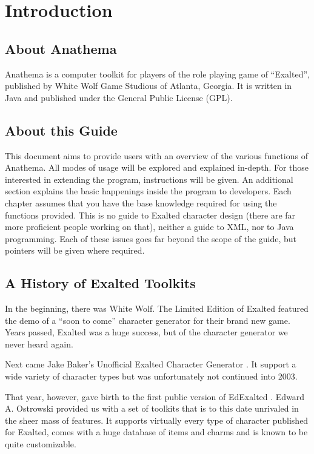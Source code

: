 \chapter{Introduction}
\section{About Anathema}
Anathema is a computer toolkit for players of the role playing game of ``Exalted'', published by White Wolf Game Studious of Atlanta, Georgia. It is written in Java and published under the General Public License (GPL).

\section{About this Guide}
This document aims to provide users with an overview of the various functions of Anathema. All modes of usage will be explored and explained in-depth. For those interested in extending the program, instructions will be given. An additional section explains the basic happenings inside the program to developers.
Each chapter assumes that you have the base knowledge required for using the functions provided. This is no guide to Exalted character design (there are far more proficient people working on that), neither a guide to XML, nor to Java programming. Each of these issues goes far beyond the scope of the guide, but pointers will be given where required.

\section{A History of Exalted Toolkits}
In the beginning, there was White Wolf. The Limited Edition of Exalted featured the demo of a ``soon to come'' character generator for their brand new game. Years passed, Exalted was a huge success, but of the character generator we never heard again.

Next came Jake Baker's Unofficial Exalted Character Generator \cite{UECG}. It support a wide variety of character types but was unfortunately not continued into 2003.

That year, however, gave birth to the first public version of EdExalted \cite{EdExalted}. Edward A. Ostrowski provided us with a set of toolkits that is to this date unrivaled in the sheer mass of features. It supports virtually every type of character published for Exalted, comes with a huge database of items and charms and is known to be quite customizable.

